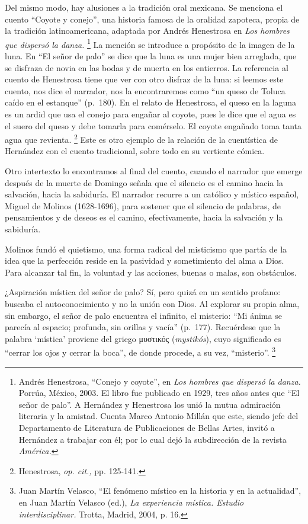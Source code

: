 \documentclass[14pt,twoside,final]{extbook} %
\let\oldfootnote\footnote
\renewcommand\footnote[1]{%
\oldfootnote{\hspace{1mm}#1}}
\begin{document}
Del mismo modo, hay alusiones a la tradición oral mexicana. Se menciona el cuento ``Coyote y conejo'', una historia famosa de la oralidad zapoteca, propia de la tradición latinoamericana, adaptada por Andrés Henestrosa en \emph{Los hombres que dispersó la danza.}\footnote{Andrés Henestrosa, ``Conejo y coyote'', en \emph{Los hombres que dispersó la danza.} Porrúa, México, 2003. El libro fue publicado en 1929, tres años antes que ``El señor de palo''. A Hernández y Henestrosa los unió la mutua admiración literaria y la amistad. Cuenta Marco Antonio Millán que este, siendo jefe del Departamento de Literatura de Publicaciones de Bellas Artes, invitó a Hernández a trabajar con él; por lo cual dejó la subdirección de la revista \emph{América.}} La mención se introduce a propósito de la imagen de la luna. En ``El señor de palo'' se dice que la luna es una mujer bien arreglada, que se disfraza de novia en las bodas y de muerta en los entierros. La referencia al cuento de Henestrosa tiene que ver con otro disfraz de la luna: si leemos este cuento, nos dice el narrador, nos la encontraremos como ``un queso de Toluca caído en el estanque'' (p.~180). En el relato de Henestrosa, el queso en la laguna es un ardid que usa el conejo para engañar al coyote, pues le dice que el agua es el suero del queso y debe tomarla para comérselo. El coyote engañado toma tanta agua que revienta.\footnote{Henestrosa, \emph{op. cit.,} pp. 125-141.} Este es otro ejemplo de la relación de la cuentística de Hernández con el cuento tradicional, sobre todo en su vertiente cómica.

Otro intertexto lo encontramos al final del cuento, cuando el narrador que emerge después de la muerte de Domingo señala que el silencio es el camino hacia la salvación, hacia la sabiduría. El narrador recurre a un católico y místico español, Miguel de Molinos (1628-1696), para sostener que el silencio de palabras, de pensamientos y de deseos es el camino, efectivamente, hacia la salvación y la sabiduría.

Molinos fundó el quietismo, una forma radical del misticismo que partía de la idea que la perfección reside en la pasividad y sometimiento del alma a Dios. Para alcanzar tal fin, la voluntad y las acciones, buenas o malas, son obstáculos.

¿Aspiración mística del señor de palo? Sí, pero quizá en un sentido profano: buscaba el autoconocimiento y no la unión con Dios. Al explorar su propia alma, sin embargo, el señor de palo encuentra el infinito, el misterio: ``Mi ánima se parecía al espacio; profunda, sin orillas y vacía'' (p.~177). Recuérdese que la palabra `mística' proviene del griego \textgreek{μυστικός} (\emph{mystikós}), cuyo significado es ``cerrar los ojos y cerrar la boca'', de donde procede, a su vez, ``misterio''.\footnote{Juan Martín Velasco, ``El fenómeno místico en la historia y en la actualidad'', en Juan Martín Velasco (ed.), \emph{La experiencia mística. Estudio interdisciplinar.} Trotta, Madrid, 2004, p. 16.}
\end{document}
